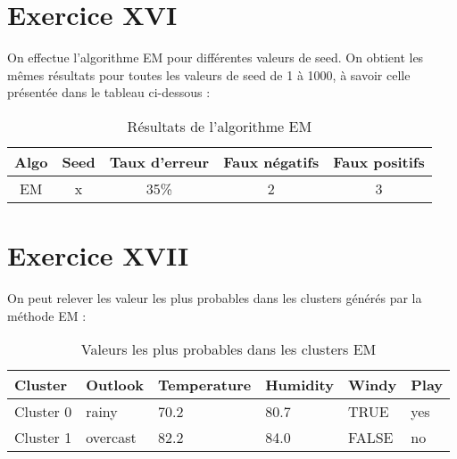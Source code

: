 \documentclass[a4paper, 11pt]{report}
\begin{document}
        
        \section{Exercice XVI}
        On effectue l'algorithme EM pour différentes valeurs de seed. On obtient les mêmes résultats pour toutes les valeurs de seed de 1 à 1000, à savoir celle présentée dans le tableau ci-dessous : 
        \begin{table}[h!]
        \centering
        \begin{tabular}{| c | c | c | c | c |}
        \hline
         Algo & Seed & Taux d'erreur & Faux négatifs & Faux positifs  \\
	\hline
         EM & x & 35\% & 2 & 3 \\
         \hline
         
        \end{tabular}
        \caption{Résultats de l'algorithme EM}
        \label{tab:exo16}
        \end{table}
        
        \section{Exercice XVII}
        On peut relever les valeur les plus probables dans les clusters générés par la méthode EM :
        \begin{table}[h!]
        \centering
        \begin{tabular}{| l | l | l | l | l | l |}
        \hline
        Cluster & Outlook & Temperature & Humidity & Windy & Play \\
        \hline
        Cluster 0 & rainy & 70.2 & 80.7 & TRUE & yes \\
        \hline
        Cluster 1 & overcast & 82.2 & 84.0 & FALSE & no \\
        \hline

        \end{tabular}
        \caption{Valeurs les plus probables dans les clusters EM}
        \label{tab:exo_6}
        \end{table}
        
\end{document}
